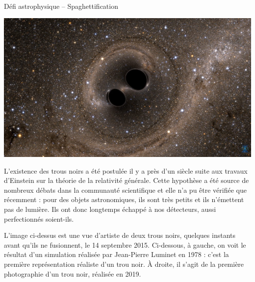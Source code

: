 \documentclass[12pt,a4paper,fleqn]{article}
\begin{document}
\normalem %

\begin{header}
Défi astrophysique -- Spaghettification
\end{header}

\begin{multicols}{2}
\begin{center}
\includegraphics[width=\linewidth]{images/blackhole_gw150914.jpg}
\end{center}

L'existence des trous noirs a été postulée il y a près d'un siècle suite aux travaux d'Einstein sur la théorie de la relativité générale.
Cette hypothèse a été source de nombreux débats dans la communauté scientifique et elle n'a pu être vérifiée que récemment : pour des objets astronomiques, ils sont très petits et ils n'émettent pas de lumière.
Ils ont donc longtemps échappé à nos détecteurs, aussi perfectionnés soient-ils.
\end{multicols}

L'image ci-dessus est une vue d'artiste de deux trous noirs, quelques instants avant qu'ils ne fusionnent, le 14 septembre 2015.
Ci-dessous, à gauche, on voit le résultat d'un simulation réalisée par Jean-Pierre Luminet en 1978 : c'est la première représentation réaliste d'un trou noir.
À droite, il s'agit de la première photographie d'un trou noir, réalisée en 2019.
\end{document}
